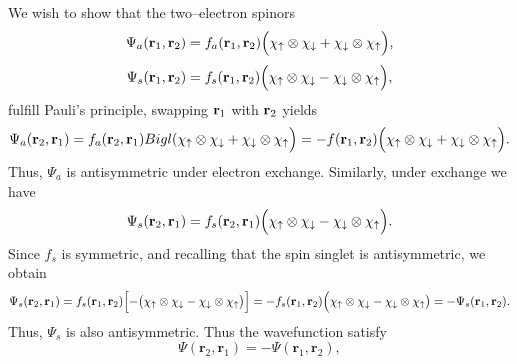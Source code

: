 \documentclass[12pt]{report}
\theoremstyle{custom}
\newcommand{\rb}{\bold{r}}
\begin{document}
We wish to show that the two–electron spinors
\[
\Psi_a(\mathbf{r}_1,\mathbf{r}_2) = f_a(\mathbf{r}_1,\mathbf{r}_2) \Bigl(\chi_\uparrow\otimes\chi_\downarrow + \chi_\downarrow\otimes\chi_\uparrow\Bigr),
\]
\[
\Psi_s(\mathbf{r}_1,\mathbf{r}_2) = f_s(\mathbf{r}_1,\mathbf{r}_2) \Bigl(\chi_\uparrow\otimes\chi_\downarrow - \chi_\downarrow\otimes\chi_\uparrow\Bigr),
\]
fulfill Pauli's principle, swapping $\rb_1$ with $\rb_2$ yields
\[
\Psi_a(\mathbf{r}_2,\mathbf{r}_1) = f_a(\mathbf{r}_2,\mathbf{r}_1)Bigl(\chi_\uparrow\otimes\chi_\downarrow + \chi_\downarrow\otimes\chi_\uparrow\Bigr) = -f(\rb_1,\rb_2)\Bigl(\chi_\uparrow\otimes\chi_\downarrow + \chi_\downarrow\otimes\chi_\uparrow\Bigr).
\]
Thus, \(\Psi_a\) is antisymmetric under electron exchange.
Similarly, under exchange we have
\[
\Psi_s(\mathbf{r}_2,\mathbf{r}_1) = f_s(\mathbf{r}_2,\mathbf{r}_1) \Bigl(\chi_\uparrow\otimes\chi_\downarrow - \chi_\downarrow\otimes\chi_\uparrow\Bigr).
\]
Since \( f_s \) is symmetric, and recalling that the spin singlet is antisymmetric, we obtain
\[
\Psi_s(\mathbf{r}_2,\mathbf{r}_1) = f_s(\mathbf{r}_1,\mathbf{r}_2) \Bigl[-\bigl(\chi_\uparrow\otimes\chi_\downarrow - \chi_\downarrow\otimes\chi_\uparrow\bigr)\Bigr]
= - f_s(\mathbf{r}_1,\mathbf{r}_2) \Bigl(\chi_\uparrow\otimes\chi_\downarrow - \chi_\downarrow\otimes\chi_\uparrow\bigr)
= - \Psi_s(\mathbf{r}_1,\mathbf{r}_2).
\]
Thus, \(\Psi_s\) is also antisymmetric. Thus the wavefunction satisfy
\[
\Psi(\mathbf{r}_2,\mathbf{r}_1) = -\Psi(\mathbf{r}_1,\mathbf{r}_2),
\]
\end{document}
